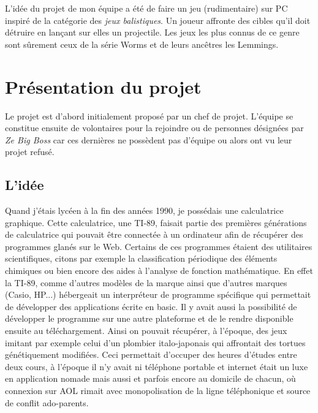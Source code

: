 \documentclass{tstextbook}
\begin{document}
L'idée du projet de mon équipe a été de faire un jeu (rudimentaire) sur PC inspiré de la catégorie des \textit{jeux balistiques}. Un joueur affronte des cibles qu'il doit détruire en lançant sur elles un projectile. Les jeux les plus connus de ce genre sont sûrement ceux de la série Worms et de leurs ancêtres les Lemmings.



\chapter{Présentation du projet}
\begin{summary}
Le projet est d'abord initialement proposé par un chef de projet. L'équipe se constitue ensuite de volontaires pour la rejoindre ou de personnes désignées par \emph{Ze Big Boss} car ces dernières ne possèdent pas d'équipe ou alors ont vu leur projet refusé.
\end{summary}
\section{L’idée}
Quand j'étais lycéen à la fin des années 1990, je possédais une calculatrice graphique. Cette calculatrice, une TI-89, faisait partie des premières générations de calculatrice qui pouvait être connectée à un ordinateur afin de récupérer des programmes glanés sur le Web. Certains de ces programmes étaient des utilitaires scientifiques, citons par exemple la classification périodique des éléments chimiques ou bien encore des aides à l'analyse de fonction mathématique. En effet la TI-89, comme d'autres modèles de la marque ainsi que d’autres marques (Casio, HP...) hébergeait un interpréteur de programme spécifique qui permettait de développer des applications écrite en basic. Il y avait aussi la possibilité de développer le programme sur une autre plateforme et de le rendre disponible ensuite au téléchargement. Ainsi on pouvait récupérer, à l'époque, des jeux imitant par exemple celui d'un plombier italo-japonais qui affrontait des tortues génétiquement modifiées. Ceci permettait d'occuper des heures d'études entre deux cours, à l'époque il n'y avait ni téléphone portable et internet était un luxe en application nomade mais aussi et parfois encore au domicile de chacun, où connexion sur AOL rimait avec monopolisation de la ligne téléphonique et source de conflit ado-parents. \\
\end{document}
